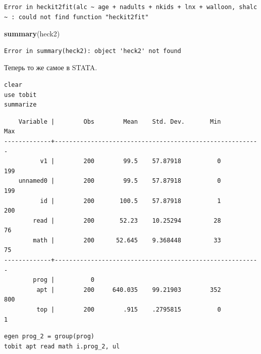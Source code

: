 \documentclass[]{book}
\newenvironment{Shaded}{\begin{snugshade}}{\end{snugshade}}
\newcommand{\KeywordTok}[1]{\textcolor[rgb]{0.13,0.29,0.53}{\textbf{#1}}}
\newcommand{\NormalTok}[1]{#1}
\begin{document}
\begin{verbatim}
Error in heckit2fit(alc ~ age + nadults + nkids + lnx + walloon, shalc ~ : could not find function "heckit2fit"
\end{verbatim}

\begin{Shaded}
\begin{Highlighting}[]
\KeywordTok{summary}\NormalTok{(heck2)}
\end{Highlighting}
\end{Shaded}

\begin{verbatim}
Error in summary(heck2): object 'heck2' not found
\end{verbatim}

Теперь то же самое в STATA.

\begin{verbatim}
clear
use tobit
summarize
\end{verbatim}

\begin{verbatim}
    Variable |        Obs        Mean    Std. Dev.       Min        Max
-------------+---------------------------------------------------------
          v1 |        200        99.5    57.87918          0        199
    unnamed0 |        200        99.5    57.87918          0        199
          id |        200       100.5    57.87918          1        200
        read |        200       52.23    10.25294         28         76
        math |        200      52.645    9.368448         33         75
-------------+---------------------------------------------------------
        prog |          0
         apt |        200     640.035    99.21903        352        800
         top |        200        .915    .2795815          0          1
\end{verbatim}

\begin{verbatim}
egen prog_2 = group(prog)
tobit apt read math i.prog_2, ul
\end{verbatim}
\end{document}

